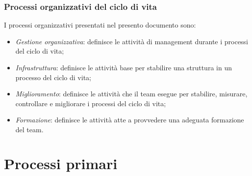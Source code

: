 \documentclass[10pt, a4paper]{article}
\begin{document}
\subsubsection{Processi organizzativi del ciclo di vita}
I processi organizzativi presentati nel presento documento sono:
\begin{itemize}
    \item \textit{Gestione organizzativa}: definisce le attività di management durante i processi del ciclo di vita;
    \item \textit{Infrastruttura}: definisce le attività base per stabilire una struttura in un processo del ciclo di vita;
    \item \textit{Miglioramento}: definisce le attività che il team esegue per stabilire, misurare, controllare e migliorare i processi del ciclo di vita;
    \item \textit{Formazione}: definisce le attività atte a provvedere una adeguata formazione del team.
\end{itemize}

\newpage
\section{Processi primari}
\end{document}
